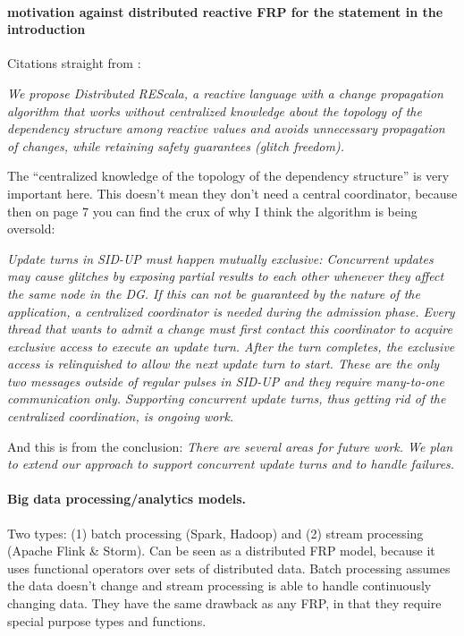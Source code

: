 {%
\paragraph{motivation against distributed reactive FRP for the statement in the introduction}
Citations straight from \cite{drescala}:

\emph{We propose Distributed REScala, a reactive language
with a change propagation algorithm that works without
centralized knowledge about the topology of the dependency
structure among reactive values and avoids unnecessary
propagation of changes, while retaining safety guarantees
(glitch freedom).}

The ``centralized knowledge of the topology of the dependency structure'' is very important here. This doesn't mean they don't need a central coordinator, because then on page 7 you can find the crux of why I think the algorithm is being oversold:

\emph{Update turns in SID-UP must happen mutually exclusive:
Concurrent updates may cause glitches by exposing partial
results to each other whenever they affect the same node in
the DG. If this can not be guaranteed by the nature of the
application, a centralized coordinator is needed during the
admission phase. Every thread that wants to admit a change
must first contact this coordinator to acquire exclusive access
to execute an update turn. After the turn completes, the
exclusive access is relinquished to allow the next update turn
to start. These are the only two messages outside of regular
pulses in SID-UP and they require many-to-one communication
only. Supporting concurrent update turns, thus getting
rid of the centralized coordination, is ongoing work.} \newline

And this is from the conclusion:
\emph{There are several areas for future work. We plan to extend
our approach to support concurrent update turns and to handle
failures.}\newline



\paragraph{Big data processing/analytics models.} Two types: (1) batch processing (Spark, Hadoop) \cite{mapreduce} and (2) stream processing (Apache Flink \& Storm). Can be seen as a  distributed FRP model, because it uses functional operators over sets of distributed data. Batch processing assumes the data doesn't change and stream processing is able to handle continuously changing data. They have the same drawback as any FRP, in that they require special purpose types and functions.


}
